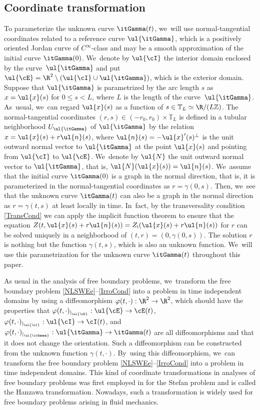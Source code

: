 \subsection{Coordinate transformation}\label{subsect:CT}
To parameterize the unknown curve $\itGamma(t)$, we~will use normal-tangential coordinates related to a reference curve $\ul{\itGamma}$,
which is a positively oriented Jordan curve of $C^\infty$-class and may be a smooth approximation of the initial curve $\itGamma(0)$. We~denote by $\ul{\cI}$ the interior domain enclosed by the curve~$\ul{\itGamma}$ and put $\ul{\cE}=\R^2\setminus(\ul{\cI}\cup\ul{\itGamma})$,
which is the exterior domain.
Suppose that $\ul{\itGamma}$ is parametrized by the arc length $s$ as $x = \ul{x}(s)$ for $0\leq s<L$, where $L$ is the length of the curve~$\ul{\itGamma}$. As~usual, we~can regard $\ul{x}(s)$ as a function of $s \in \mathbb{T}_L \simeq \R/(L\mathbb{Z})$.
The normal-tangential coordinates $(r,s)\in(-r_0,r_0)\times\mathbb{T}_L$ is defined in a tubular neighborhood $U_{\ul{\itGamma}}$ of $\ul{\itGamma}$
by the relation $x=\ul{x}(s)+r\ul{n}(s)$,
where $\ul{n}(s)=-\ul{x}'(s)^\perp$ is the unit outward normal vector to $\ul{\itGamma}$ at the point $\ul{x}(s)$ and pointing from $\ul{\cI}$ to $\ul{\cE}$. We~denote by $\ul{N}$ the unit outward normal vector to $\ul{\itGamma}$, that is, $\ul{N}(\ul{x}(s))=\ul{n}(s)$. We~assume that the initial curve $\itGamma(0)$ is a graph in the normal direction, that is,
it is parameterized in the normal-tangential coordinates as $r=\gamma(0,s)$.
Then, we~see that the unknown curve $\itGamma(t)$ can also be a graph in the normal direction as $r=\gamma(t,s)$ at least locally in time. In~fact, by the transversality condition \eqref{TransCond} we can apply the implicit function theorem to ensure that the equation
$Z(t,\ul{x}(s)+r\ul{n}(s)) = Z_\mathrm{i}(\ul{x}(s)+r\ul{n}(s))$ for $r$ can be solved uniquely in a neighborhood of $(t,r)=(0,\gamma(0,s))$.
The solution $r$ is nothing but the function $\gamma(t,s)$, which is also an unknown function. We~will use this parametrization for the unknown curve $\itGamma(t)$ throughout this paper.

As usual in the analysis of free boundary problems, we~transform the free boundary problem \eqref{NLSWEe}--\eqref{IrroCond} into a problem
in time independent domains by using a diffeomorphism $\varphi(t,\cdot):\R^2\to\R^2$, which should have the properties that
$\varphi(t,\cdot)_{\vert_{\ul{\cE}}} : \ul{\cE}\to \cE(t)$, $\varphi(t,\cdot)_{\vert_{\ul{\cI}}} : \ul{\cI}\to \cI(t)$,
and $\varphi(t,\cdot)_{\vert_{\ul{\itGamma}}} : \ul{\itGamma}\to \itGamma(t)$ are all diffeomorphisms and that it does not change the orientation.
Such a diffeomorphism can be constructed from the unknown function $\gamma(t,\cdot)$. By~using this diffeomorphism, we~can transform the free boundary problem \eqref{NLSWEe}--\eqref{IrroCond} into a problem in time independent domains.
This kind of coordinate transformations in analyses of free boundary problems was first employed in \cite{Hanzawa1981} for the Stefan problem
and is called the Hanzawa transformation.
Nowadays, such a transformation is widely used for free boundary problems arising in fluid mechanics.

